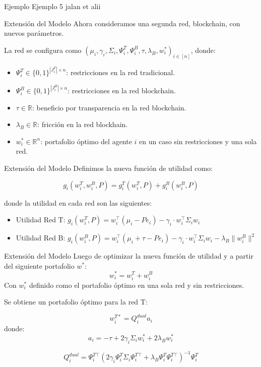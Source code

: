 \documentclass{beamer}
\begin{document}
\begin{frame}{Ejemplo}
Ejemplo 5 jalan et alii
\end{frame}

\begin{frame}{Extensión del Modelo}
Ahora consideramos una segunda red, blockchain, con nuevos parámetros. 

La red se configura como $(\mu_i, \gamma_i, \Sigma_i, \Psi_i^T, \Psi_i^B, \tau, \lambda_B, w_i^*)_{i \in [n]}$, donde:
\begin{itemize}
   \item $\Psi_i^T \in \{0,1\}^{|J_i^T| \times n}$: restricciones en la red tradicional.
   \item $\Psi_i^B \in \{0,1\}^{|J_i^B| \times n}$: restricciones en la red blockchain.
   \item $\tau \in \mathbb{R}$: beneficio por transparencia en la red blockchain.
   \item $\lambda_B \in \mathbb{R}$: fricción en la red blockhain.
   \item $w_i^* \in \mathbb{R}^n$: portafolio óptimo del agente $i$ en un caso sin restricciones y una sola red.
\end{itemize}
\end{frame}

\begin{frame}{Extensión del Modelo}
Definimos la nueva función de utilidad como: 

 $$g_i(w_i^T,w_i^B, P)=g_i^T(w_i^T,P)+g_i^B(w_i^B,P)$$
 
donde la utilidad en cada red son las siguientes: \\
\begin{itemize}
    \item Utilidad Red T: $g_i(w_i^T,P) = w_i^\top (\mu_i - P e_i) - \gamma_i \cdot w_i^\top \Sigma_i w_i$
    \item Utilidad Red B: $g_i(w_i^B,P) = w_i^\top (\mu_i + \tau - P e_i) - \gamma_i \cdot w_i^\top \Sigma_i w_i-\lambda_B \|w_i^B\|^2$
\end{itemize}

\end{frame}



\begin{frame}{Extensión del Modelo}
Luego de optimizar la nueva función de utilidad y a partir del siguiente portafolio $w^*$: $$w_i^*=w_i^T+w_i^B$$
Con $w_i^*$ definido como el portafolio óptimo en una sola red y sin restricciones.

Se obtiene un portafolio óptimo para la red T:

$$w_i^{T*}=Q_i^{dual}a_i$$
donde:
$$a_i= -\tau + 2\gamma_i \Sigma_i w_i^*+2\lambda_Bw_i^*$$

$$Q_i^{dual}=\Psi_i^{T\top}(2\gamma_i\Psi_i^T \Sigma_i \Psi_i^{T\top}+\lambda_B\Psi_i^T\Psi_i^{T\top})^{-1}\Psi_i^T$$
\end{frame}
\end{document}
